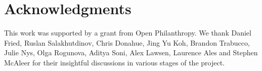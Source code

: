\documentclass{article}
\begin{document}

\section*{Acknowledgments}
This work was supported by a grant from Open Philanthropy.
We thank Daniel Fried, Ruslan Salakhutdinov, Chris Donahue, Jing Yu Koh, Brandon Trabucco, Julie Nys, Olga Rogunova, Aditya Soni, Alex Lawsen, Laurence Ales and Stephen McAleer for their insightful discussions in various stages of the project.





\newpage
\appendix


\end{document}
